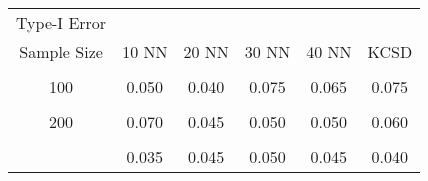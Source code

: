 \begin{table}[!h]
\centering\begingroup\fontsize{5}{7}\selectfont

\begin{tabular}{cccccc}
\toprule
\multicolumn{1}{c}{Type-I Error} \\
\cmidrule(l{3pt}r{3pt}){1-1}
Sample Size &  10 NN & 20 NN & 30 NN & 40 NN & KCSD\\
\midrule
\cellcolor{gray!6}{50} & \cellcolor{gray!6}{0.025} & \cellcolor{gray!6}{0.035} & \cellcolor{gray!6}{0.030} & \cellcolor{gray!6}{0.035} & \cellcolor{gray!6}{0.060}\\
100 & 0.050 & 0.040 & 0.075 & 0.065 & 0.075\\
\cellcolor{gray!6}{150} & \cellcolor{gray!6}{0.045} & \cellcolor{gray!6}{0.055} & \cellcolor{gray!6}{0.055} & \cellcolor{gray!6}{0.035} & \cellcolor{gray!6}{0.085}\\
200 & 0.070 & 0.045 & 0.050 & 0.050 & 0.060\\
\cellcolor{gray!6}{250} & \cellcolor{gray!6}{0.060} & \cellcolor{gray!6}{0.065} & \cellcolor{gray!6}{0.045} & \cellcolor{gray!6}{0.050} & \cellcolor{gray!6}{0.065}\\
\addlinespace
300 & 0.035 & 0.045 & 0.050 & 0.045 & 0.040\\
\bottomrule
\end{tabular}
\endgroup{}
\end{table}

